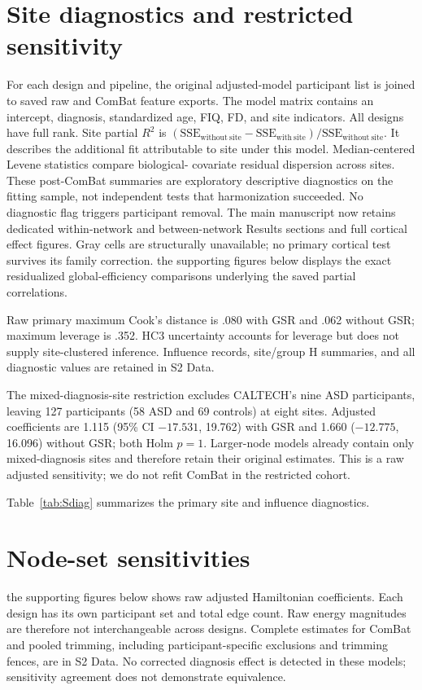 \documentclass[10pt,letterpaper]{article}
\begin{document}
\section*{Site diagnostics and restricted sensitivity}
For each design and pipeline, the original adjusted-model participant list is
joined to saved raw and ComBat feature exports. The model matrix contains an
intercept, diagnosis, standardized age, FIQ, FD, and site indicators. All designs
have full rank. Site partial $R^2$ is
$(\mathrm{SSE}_{\mathrm{without\ site}}-\mathrm{SSE}_{\mathrm{with\ site}})/
\mathrm{SSE}_{\mathrm{without\ site}}$. It describes the additional fit attributable
to site under this model. Median-centered Levene statistics compare biological-
covariate residual dispersion across sites. These post-ComBat summaries are
exploratory descriptive diagnostics on the fitting sample, not independent tests
that harmonization succeeded. No diagnostic flag triggers participant removal.
The main manuscript now retains dedicated within-network and between-network
Results sections and full cortical effect figures. Gray cells are structurally
unavailable; no primary cortical test survives its family correction.
the supporting figures below displays the exact residualized global-efficiency
comparisons underlying the saved partial correlations.

Raw primary maximum Cook's distance is .080 with GSR and .062 without GSR;
maximum leverage is .352. HC3 uncertainty accounts for leverage but does not
supply site-clustered inference. Influence records, site/group H summaries, and
all diagnostic values are retained in S2 Data.

The mixed-diagnosis-site restriction excludes CALTECH's nine ASD participants,
leaving 127 participants (58 ASD and 69 controls) at eight sites. Adjusted
coefficients are 1.115 (95\% CI $-17.531$, 19.762) with GSR and 1.660
($-12.775$, 16.096) without GSR; both Holm $p=1$. Larger-node models already
contain only mixed-diagnosis sites and therefore retain their original estimates.
This is a raw adjusted sensitivity; we do not refit ComBat in the restricted cohort.

Table~\ref{tab:Sdiag} summarizes the primary site and influence diagnostics.


\section*{Node-set sensitivities}
the supporting figures below shows raw adjusted Hamiltonian coefficients. Each design has
its own participant set and total edge count. Raw energy magnitudes are therefore
not interchangeable across designs. Complete estimates for ComBat and pooled
trimming, including participant-specific exclusions and trimming fences, are
in S2 Data. No corrected diagnosis effect is detected in these
models; sensitivity agreement does not demonstrate equivalence.
\end{document}
